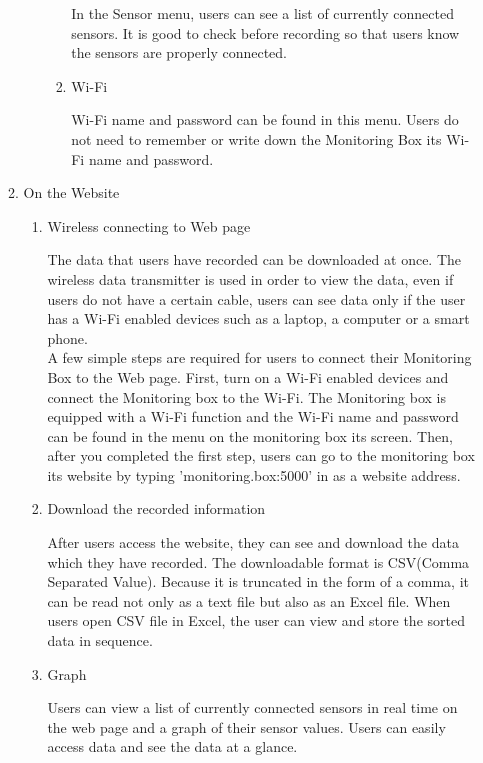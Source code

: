 \documentclass[conference]{IEEEtran}
\begin{document}
\begin{enumerate}
\begin{enumerate}
\begin{enumerate}
\begin{enumerate}
						In the Sensor menu, users can see a list of currently connected sensors. It is good to check before recording so that users know the sensors are properly connected.\\
					\item Wi-Fi

						Wi-Fi name and password can be found in this menu. Users do not need to remember or write down the Monitoring Box its Wi-Fi name and password.\\
				\end{enumerate}
			\end{enumerate}
		\item On the Website
			\begin{enumerate}
				\item Wireless connecting to Web page

					The data that users have recorded can be downloaded at once. The wireless data transmitter is used in order to view the data, even if users do not have a certain cable, users can see data only if the user has a Wi-Fi enabled devices such as a laptop, a computer or a smart phone. \\
					A few simple steps are required for users to connect their Monitoring Box to the Web page. First, turn on a Wi-Fi enabled devices and connect the Monitoring box to the Wi-Fi. The Monitoring box is equipped with a Wi-Fi function and the Wi-Fi name and password can be found in the menu on the monitoring box its screen. Then, after you completed the first step, users can go to the monitoring box its website by typing 'monitoring.box:5000' in as a website address.\\

				\item Download the recorded information

					After users access the website, they can see and download the data which they have recorded. The downloadable format is CSV(Comma Separated Value). Because it is truncated in the form of a comma, it can be read not only as a text file but also as an Excel file. When users open CSV file in Excel, the user can view and store the sorted data in sequence.\\

				\item Graph

					Users can view a list of currently connected sensors in real time on the web page and a graph of their sensor values. Users can easily access data and see the data at a glance.\\
			\end{enumerate}
		\end{enumerate}
 	\end{enumerate}
\end{document}
